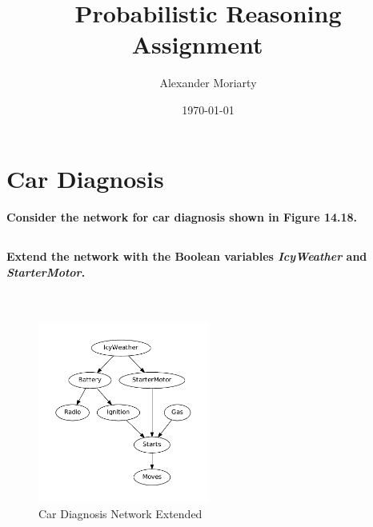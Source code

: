 \documentclass[	DIV=calc,%
				paper=a4,%
				fontsize=11pt,%
				twocolumn]{article}	 %
\title{Probabilistic Reasoning
\\ Assignment ~\upperRomannumeral{4}}%
\author{Alexander Moriarty }	%
\date{\today}
\begin{document}
\maketitle
\thispagestyle{fancy} %


\section{Car Diagnosis}
\paragraph{Consider the network for car diagnosis shown in Figure 14.18. }
\subsection{}
\paragraph{Extend the network with the Boolean variables \emph{IcyWeather} and \emph{StarterMotor}.}
~\\
\begin{figure}[h]
  \centering
  \caption{Car Diagnosis Network Extended}
  \includegraphics[width=0.5\textwidth]{./car_diagnosis}
\end{figure}
\newpage
\subsection{}
\end{document}
